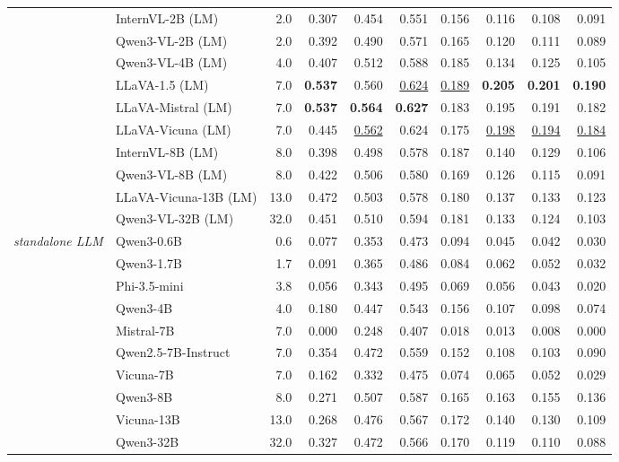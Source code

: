 \begin{table}[t]
{\begin{tabular}{llrrrrrrrr}
 & InternVL-2B (LM) & 2.0 & 0.307 & 0.454 & 0.551 & 0.156 & 0.116 & 0.108 & 0.091 \\
 & Qwen3-VL-2B (LM) & 2.0 & 0.392 & 0.490 & 0.571 & 0.165 & 0.120 & 0.111 & 0.089 \\
 & Qwen3-VL-4B (LM) & 4.0 & 0.407 & 0.512 & 0.588 & 0.185 & 0.134 & 0.125 & 0.105 \\
 & LLaVA-1.5 (LM) & 7.0 & \textbf{0.537} & 0.560 & \underline{0.624} & \underline{0.189} & \textbf{0.205} & \textbf{0.201} & \textbf{0.190} \\
 & LLaVA-Mistral (LM) & 7.0 & \textbf{0.537} & \textbf{0.564} & \textbf{0.627} & 0.183 & 0.195 & 0.191 & 0.182 \\
 & LLaVA-Vicuna (LM) & 7.0 & 0.445 & \underline{0.562} & 0.624 & 0.175 & \underline{0.198} & \underline{0.194} & \underline{0.184} \\
 & InternVL-8B (LM) & 8.0 & 0.398 & 0.498 & 0.578 & 0.187 & 0.140 & 0.129 & 0.106 \\
 & Qwen3-VL-8B (LM) & 8.0 & 0.422 & 0.506 & 0.580 & 0.169 & 0.126 & 0.115 & 0.091 \\
 & LLaVA-Vicuna-13B (LM) & 13.0 & 0.472 & 0.503 & 0.578 & 0.180 & 0.137 & 0.133 & 0.123 \\
 & Qwen3-VL-32B (LM) & 32.0 & 0.451 & 0.510 & 0.594 & 0.181 & 0.133 & 0.124 & 0.103 \\
\midrule
\multirow{10}{*}{\textit{standalone LLM}} & Qwen3-0.6B & 0.6 & 0.077 & 0.353 & 0.473 & 0.094 & 0.045 & 0.042 & 0.030 \\
 & Qwen3-1.7B & 1.7 & 0.091 & 0.365 & 0.486 & 0.084 & 0.062 & 0.052 & 0.032 \\
 & Phi-3.5-mini & 3.8 & 0.056 & 0.343 & 0.495 & 0.069 & 0.056 & 0.043 & 0.020 \\
 & Qwen3-4B & 4.0 & 0.180 & 0.447 & 0.543 & 0.156 & 0.107 & 0.098 & 0.074 \\
 & Mistral-7B & 7.0 & 0.000 & 0.248 & 0.407 & 0.018 & 0.013 & 0.008 & 0.000 \\
 & Qwen2.5-7B-Instruct & 7.0 & 0.354 & 0.472 & 0.559 & 0.152 & 0.108 & 0.103 & 0.090 \\
 & Vicuna-7B & 7.0 & 0.162 & 0.332 & 0.475 & 0.074 & 0.065 & 0.052 & 0.029 \\
 & Qwen3-8B & 8.0 & 0.271 & 0.507 & 0.587 & 0.165 & 0.163 & 0.155 & 0.136 \\
 & Vicuna-13B & 13.0 & 0.268 & 0.476 & 0.567 & 0.172 & 0.140 & 0.130 & 0.109 \\
 & Qwen3-32B & 32.0 & 0.327 & 0.472 & 0.566 & 0.170 & 0.119 & 0.110 & 0.088 \\

\end{tabular}}
\end{table}
